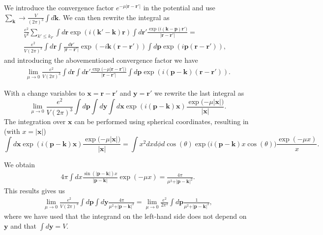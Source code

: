 \documentclass[%
oneside,                 %
final,                   %
10pt]{article}
\newenvironment{doconceexercise}{}{}
\begin{document}
\begin{doconceexercise}
We introduce the convergence factor 
$e^{-\mu\vert\mathbf{r}-\mathbf{r}'\vert}$
in the potential and use  $\sum_{\mathbf{k}}\rightarrow
\frac{V}{(2\pi)^{3}}\int d\mathbf{k}$. We can then rewrite the integral as 
\begin{align}
\frac{e^{2}}
{V^{2}}\sum_{k'\leq
k_{F}}\int d\mathbf{r}\exp{(i(\mathbf{k'}-\mathbf{k})\mathbf{r})}\int
d\mathbf{r}'\frac{\exp{(i(\mathbf{k}-\mathbf{p})\mathbf{r}'})}
{\vert\mathbf{r}-\mathbf{r'}\vert}= & \\
\frac{e^{2}}{V (2\pi)^3}  \int d\mathbf{r}\int
\frac{d\mathbf{r}'}{\vert\mathbf{r}-\mathbf{r'}\vert}\exp{(-i\mathbf{k}(\mathbf{r}-\mathbf{r}'))}\int d\mathbf{p}\exp{(i\mathbf{p}(\mathbf{r}-\mathbf{r}'))},
\end{align}
and introducing the abovementioned convergence factor we have
\begin{align}
\lim_{\mu \to 0}\frac{e^{2}}{V (2\pi)^3}  \int d\mathbf{r}\int d\mathbf{r}'\frac{\exp{(-\mu\vert\mathbf{r}-\mathbf{r}'\vert})}{\vert\mathbf{r}-\mathbf{r'}\vert}\int d\mathbf{p}\exp{(i(\mathbf{p}-\mathbf{k})(\mathbf{r}-\mathbf{r}'))}.
\end{align}


With a change variables to $\mathbf{x} = \mathbf{r}-\mathbf{r}'$ and $\mathbf{y}=\mathbf{r}'$ we rewrite the last integral as
\[
\lim_{\mu \to 0}\frac{e^{2}}{V (2\pi)^3}  \int d\mathbf{p}\int d\mathbf{y}\int d\mathbf{x}\exp{(i(\mathbf{p}-\mathbf{k})\mathbf{x})}\frac{\exp{(-\mu\vert\mathbf{x}\vert})}{\vert\mathbf{x}\vert}.
\]
The integration over $\mathbf{x}$ can be performed using spherical coordinates, resulting in (with $x=\vert \mathbf{x}\vert$)
\[
\int d\mathbf{x}\exp{(i(\mathbf{p}-\mathbf{k})\mathbf{x})}\frac{\exp{(-\mu\vert\mathbf{x}\vert})}{\vert\mathbf{x}\vert}=\int x^2 dx d\phi d\cos{(\theta)}\exp{(i(\mathbf{p}-\mathbf{k})x\cos{(\theta))}}\frac{\exp{(-\mu x)}}{x}.
\]


We obtain
\begin{align}
4\pi \int dx \frac{ \sin{(\vert \mathbf{p}-\mathbf{k}\vert)x} }{\vert \mathbf{p}-\mathbf{k}\vert}{\exp{(-\mu x)}}= \frac{4\pi}{\mu^2+\vert \mathbf{p}-\mathbf{k}\vert^2}.
\end{align}
This results gives us 
\begin{align}
\lim_{\mu \to 0}\frac{e^{2}}{V (2\pi)^3}  \int d\mathbf{p}\int d\mathbf{y}\frac{4\pi}{\mu^2+\vert \mathbf{p}-\mathbf{k}\vert^2}=\lim_{\mu \to 0}\frac{e^{2}}{ 2\pi^2}  \int d\mathbf{p}\frac{1}{\mu^2+\vert \mathbf{p}-\mathbf{k}\vert^2},
\end{align}
where we have used that the integrand on the left-hand side does not depend on $\mathbf{y}$ and that $\int d\mathbf{y}=V$.


\end{doconceexercise}
\end{document}
